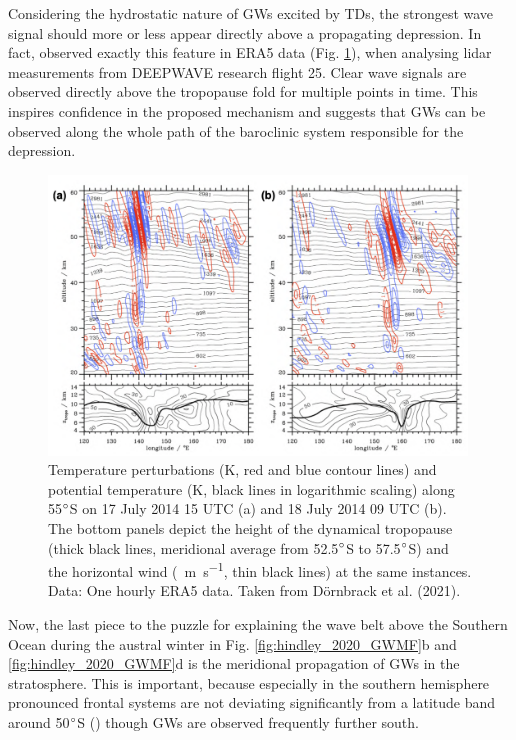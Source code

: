 Considering the hydrostatic nature of GWs excited by TDs, the strongest wave signal should more or less appear directly above a propagating depression. In fact, \textcite{dornbrack_stratospheric_2021} observed exactly this feature in ERA5 data (Fig. \ref{fig:RF25_waves}), when analysing lidar measurements from DEEPWAVE research flight 25. Clear wave signals are observed directly above the tropopause fold for multiple points in time. This inspires confidence in the proposed mechanism and suggests that GWs can be observed along the whole path of the baroclinic system responsible for the depression.
%
\begin{figure}[h]
    \centering
    \includegraphics[width=0.99\textwidth]{Figures/RF25_waves.png}
    \caption{Temperature perturbations (K, red and blue contour lines) and potential temperature (K, black lines in logarithmic scaling) along 55$\degree$S on 17 July 2014 15 UTC (a) and 18 July 2014 09 UTC (b). The bottom panels depict the height of the dynamical tropopause (thick black lines, meridional average from 52.5$\degree$S to 57.5$\degree$S) and the horizontal wind (\SI{}{\meter\second^{-1}}, thin black lines) at the same instances. Data: One hourly ERA5 data. Taken from Dörnbrack et al. (2021).}
    \label{fig:RF25_waves}
\end{figure}
%
Now, the last piece to the puzzle for explaining the wave belt above the Southern Ocean during the austral winter in Fig. \ref{fig:hindley_2020_GWMF}b and \ref{fig:hindley_2020_GWMF}d is the meridional propagation of GWs in the stratosphere. This is important, because especially in the southern hemisphere pronounced frontal systems are not deviating significantly from a latitude band around 50$\degree$S (\cite{skerlak_tropopause_2015}) though GWs are observed frequently further south.

